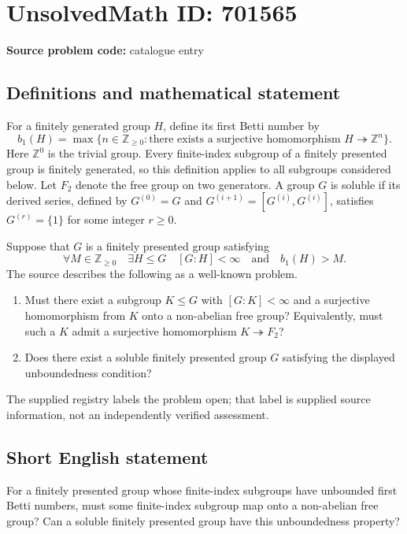 \documentclass[11pt]{article}
\newcommand{\Z}{\mathbb{Z}}
\begin{document}
\section*{UnsolvedMath ID: 701565}
\textbf{Source problem code:} catalogue entry
\subsection{Definitions and mathematical statement}
For a finitely generated group \(H\), define its first Betti number by
\[
b_1(H)=\max\{n\in\Z_{\geq 0}:\text{there exists a surjective homomorphism }H\twoheadrightarrow\Z^n\}.
\]
Here \(\Z^0\) is the trivial group. Every finite-index subgroup of a finitely presented group is finitely generated, so this definition applies to all subgroups considered below. Let \(F_2\) denote the free group on two generators. A group \(G\) is soluble if its derived series, defined by \(G^{(0)}=G\) and \(G^{(i+1)}=[G^{(i)},G^{(i)}]\), satisfies \(G^{(r)}=\{1\}\) for some integer \(r\geq 0\).

Suppose that \(G\) is a finitely presented group satisfying
\[
\forall M\in\Z_{\geq 0}\quad \exists H\leq G\quad [G:H]<\infty\quad\text{and}\quad b_1(H)>M.
\]
The source describes the following as a well-known problem.
\begin{enumerate}
\item[(a)] Must there exist a subgroup \(K\leq G\) with \([G:K]<\infty\) and a surjective homomorphism from \(K\) onto a non-abelian free group? Equivalently, must such a \(K\) admit a surjective homomorphism \(K\twoheadrightarrow F_2\)?
\item[(b)] Does there exist a soluble finitely presented group \(G\) satisfying the displayed unboundedness condition?
\end{enumerate}
The supplied registry labels the problem open; that label is supplied source information, not an independently verified assessment.
\subsection{Short English statement}
For a finitely presented group whose finite-index subgroups have unbounded first Betti numbers, must some finite-index subgroup map onto a non-abelian free group? Can a soluble finitely presented group have this unboundedness property?
\end{document}
